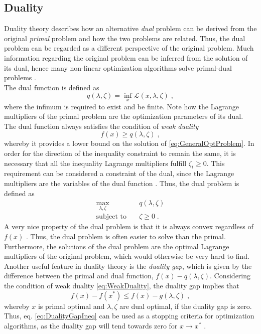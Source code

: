 \subsection{Duality}
Duality theory describes how an alternative \textit{dual} problem can be derived from the original \textit{primal} problem and how the two problems are related. Thus, the dual problem can be regarded as a different perspective of the original problem. Much information regarding the original problem can be inferred from the solution of its dual, hence many non-linear optimization algorithms solve primal-dual problems \cite{wright}.\\
The dual function is defined as
\begin{equation}
	q (\lambda , \zeta) = \inf_{x} \mathcal{L} (x,\lambda,\zeta) \; ,
\end{equation}
where the infimum is required to exist and be finite. Note how the Lagrange multipliers of the primal problem are the optimization parameters of its dual. The dual function always satisfies the condition of \textit{weak duality}
\begin{equation}
	f(x) \geq q (\lambda , \zeta) \; ,
	\label{eq:WeakDuality}
\end{equation} 
whereby it provides a lower bound on the solution of \eqref{eq:GeneralOptProblem}. In order for the direction of the inequality constraint to remain the same, it is necessary that all the inequality Lagrange multipliers fulfill $\zeta_i \geq 0$. This requirement can be considered a constraint of the dual, since the Lagrange multipliers are the variables of the dual function \cite{wright}. Thus, the dual problem is defined as
\begin{subequations}	
 \begin{align}
	\max_{\lambda , \zeta} 	\quad 	& q(\lambda , \zeta) 				\\
	\text{subject to} 		\quad 	& \zeta \geq 0  			\; .
\end{align}
\label{eq:GeneralDualProblem}
\end{subequations}
A very nice property of the dual problem is that it is always convex regardless of $f(x)$ \cite{Rockafellar1974}. Thus, the dual problem is often easier to solve than the primal. Furthermore, the solutions of the dual problem are the optimal Lagrange multipliers of the original problem, which would otherwise be very hard to find.
Another useful feature in duality theory is the \textit{duality gap}, which is given by the difference between the primal and dual function, $f(x) - q(\lambda , \zeta )$. Considering the condition of weak duality \eqref{eq:WeakDuality}, the duality gap implies that
\begin{equation}
	f(x) - f(x^*) \leq f(x) - g(\lambda , \zeta) \; ,
	\label{eq:DualityGapIneq}
\end{equation}
whereby $x$ is primal optimal and $\lambda , \zeta$ are dual optimal, if the duality gap is zero. Thus, eq. \eqref{eq:DualityGapIneq} can be used as a stopping criteria for optimization algorithms, as the duality gap will tend towards zero for $x \to x^*$ \cite{wright}.


